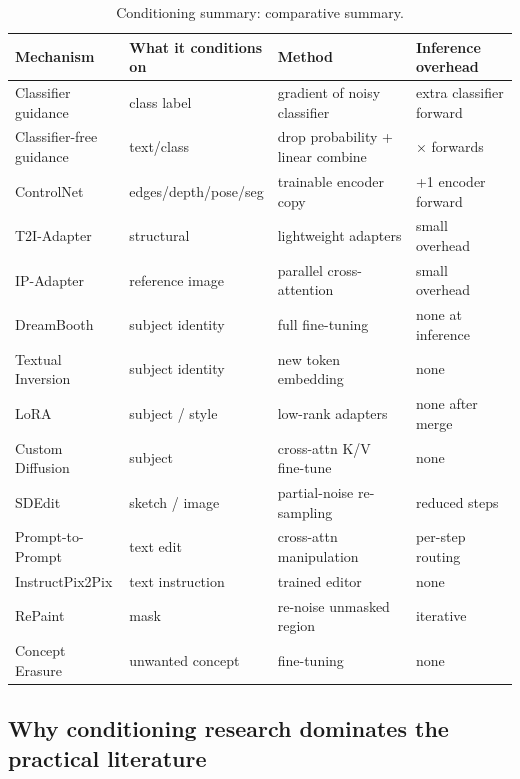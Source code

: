 \documentclass{article}
\begin{document}
\begin{table}[t]
\centering
\caption{Conditioning summary: comparative summary.}
\label{tab:conditioning-summary}
\begin{tabular}{>{\raggedright\arraybackslash}p{0.2353\linewidth}
  >{\raggedright\arraybackslash}p{0.2059\linewidth}
  >{\raggedright\arraybackslash}p{0.3235\linewidth}
  >{\raggedright\arraybackslash}p{0.2353\linewidth}}
\toprule
Mechanism & What it conditions on & Method & Inference overhead \\
\midrule
Classifier guidance & class label & gradient of noisy classifier & extra classifier forward \\
Classifier-free guidance & text/class & drop probability + linear combine & 2× forwards \\
ControlNet & edges/depth/pose/seg & trainable encoder copy & +1 encoder forward \\
T2I-Adapter & structural & lightweight adapters & small overhead \\
IP-Adapter & reference image & parallel cross-attention & small overhead \\
DreamBooth & subject identity & full fine-tuning & none at inference \\
Textual Inversion & subject identity & new token embedding & none \\
LoRA & subject / style & low-rank adapters & none after merge \\
Custom Diffusion & subject & cross-attn K/V fine-tune & none \\
SDEdit & sketch / image & partial-noise re-sampling & reduced steps \\
Prompt-to-Prompt & text edit & cross-attn manipulation & per-step routing \\
InstructPix2Pix & text instruction & trained editor & none \\
RePaint & mask & re-noise unmasked region & iterative \\
Concept Erasure & unwanted concept & fine-tuning & none \\
\end{tabular}
\end{table}

\subsection{Why conditioning research dominates the practical literature}\label{why-conditioning-research-dominates-the-practical-literature}
\end{document}
